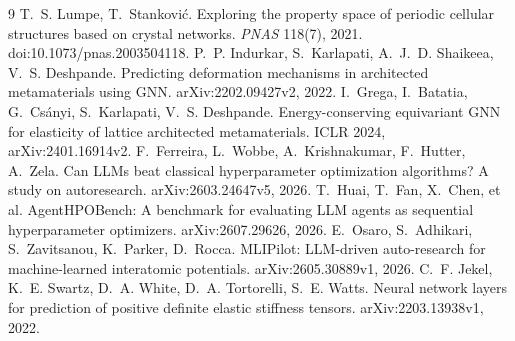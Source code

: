 \documentclass[11pt]{article}
\begin{document}
\begin{thebibliography}{9}\footnotesize\setlength{\itemsep}{0pt}
 T.~S. Lumpe, T.~Stankovi\'c. Exploring the property space of periodic cellular
  structures based on crystal networks. \emph{PNAS} 118(7), 2021. doi:10.1073/pnas.2003504118.
 P.~P. Indurkar, S.~Karlapati, A.~J.~D. Shaikeea, V.~S. Deshpande. Predicting
  deformation mechanisms in architected metamaterials using GNN. arXiv:2202.09427v2, 2022.
 I.~Grega, I.~Batatia, G.~Cs\'anyi, S.~Karlapati, V.~S. Deshpande.
  Energy-conserving equivariant GNN for elasticity of lattice architected metamaterials. ICLR 2024,
  arXiv:2401.16914v2.
 F.~Ferreira, L.~Wobbe, A.~Krishnakumar, F.~Hutter, A.~Zela. Can LLMs beat
  classical hyperparameter optimization algorithms? A study on autoresearch. arXiv:2603.24647v5,
  2026.
 T.~Huai, T.~Fan, X.~Chen, et al. AgentHPOBench: A benchmark for evaluating LLM
  agents as sequential hyperparameter optimizers. arXiv:2607.29626, 2026.
 E.~Osaro, S.~Adhikari, S.~Zavitsanou, K.~Parker, D.~Rocca. MLIPilot: LLM-driven
  auto-research for machine-learned interatomic potentials. arXiv:2605.30889v1, 2026.
 C.~F. Jekel, K.~E. Swartz, D.~A. White, D.~A. Tortorelli, S.~E. Watts. Neural
network layers for prediction of positive definite elastic stiffness tensors. arXiv:2203.13938v1,
2022.
\end{thebibliography}
\end{document}
